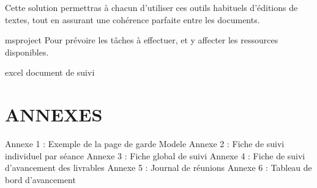Cette solution permettras à chacun  d’utiliser ces outils habituels d’éditions de textes, tout en assurant une cohérence parfaite entre les documents.

msproject
Pour prévoire les tâches à effectuer, et y affecter les ressources disponibles.

excel document de suivi



\section{ANNEXES}
Annexe 1 : Exemple de la page de garde
Modele
Annexe 2 : Fiche de suivi individuel par séance
Annexe 3 : Fiche global de suivi
Annexe 4 : Fiche de suivi d'avancement des livrables
Annexe 5 : Journal de réunions
Annexe 6 : Tableau de bord d'avancement
